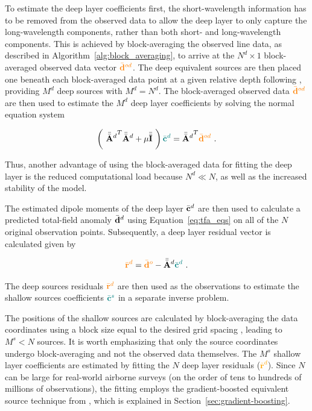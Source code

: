 To estimate the deep layer coefficients first, the short-wavelength information has to be removed from the observed data to allow the deep layer to only capture the long-wavelength components, rather than both short- and long-wavelength components. This is achieved by block-averaging the observed line data, as described in Algorithm~\ref{alg:block_averaging}, to arrive at the $N^d \times 1$ block-averaged observed data vector $\textcolor{orange}{\bar{\mathbf{d}}^{od}}$.
The deep equivalent sources are then placed one beneath each block-averaged data point at a given relative depth following \citet{Soler2021}, providing $M^d$ deep sources with $M^d = N^d$.
The block-averaged observed data $\textcolor{orange}{\bar{\mathbf{d}}^{od}}$ are then used to estimate the $M^d$ deep layer coefficients by solving the normal equation system

\begin{equation}
    \left(\ {\bar{\bar{\mathbf{A}}}^d}^T \bar{\bar{\mathbf{A}}}^d + \mu \bar{\bar{\mathbf{I}}}\ \right) 
    \textcolor{teal}{\bar{\mathbf{c}}^d} =
    {\bar{\bar{\mathbf{A}}}^d}^T\textcolor{orange}{\bar{\mathbf{d}}^{od}}
    \ .
\end{equation}

\noindent
Thus, another advantage of using the block-averaged data for fitting the deep layer is the reduced computational load because $N^d \ll N$, as well as the increased stability of the model. 

The estimated dipole moments of the deep layer \textcolor{teal}{$\bar{\mathbf{c}}^d$} are then used to calculate a predicted total-field anomaly \textcolor{orange}{$\bar{\mathbf{d}}^d$} using Equation~\ref{eq:tfa_eqs} on all of the $N$ original observation points.
Subsequently, a deep layer residual vector is calculated given by

\begin{equation}
    \textcolor{orange}{\bar{\mathbf{r}}^d} = 
    \textcolor{orange}{\bar{\mathbf{d}}^o} - \bar{\bar{\mathbf{A}}}^d \textcolor{teal}{\bar{\mathbf{c}}^d}
    \ .
    \label{eq:deep_residual}
\end{equation}

\noindent
The deep sources residuals $\textcolor{orange}{\bar{\mathbf{r}}^d}$ are then used as the observations to estimate the shallow sources coefficients $\textcolor{teal}{\bar{\mathbf{c}}^s}$ in a separate inverse problem. 

The positions of the shallow sources are calculated by block-averaging the data coordinates using a block size equal to the desired grid spacing \citep{Soler2021}, leading to $M^s < N$ sources.
It is worth emphasizing that only the source coordinates undergo block-averaging and not the observed data themselves.
The $M^s$ shallow layer coefficients are estimated by fitting the $N$ deep layer residuals (\textcolor{orange}{$\bar{\mathbf{r}}^d$}). Since $N$ can be large for real-world airborne surveys (on the order of tens to hundreds of millions of observations), the fitting employs the gradient-boosted equivalent source technique from \citet{Soler2021}, which is explained in Section~\ref{sec:gradient-boosting}. 

